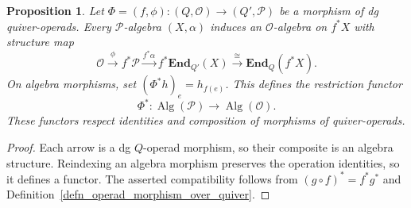 \documentclass[11pt,letterpaper]{article}
\numberwithin{equation}{section}
\theoremstyle{plain}
\newtheorem{prop}[thm]{Proposition}
\theoremstyle{definition}
\theoremstyle{remark}
\begin{document}
\begin{prop}\label{prop_change_quiver_algebras}
Let $\Phi=(f,\phi):(Q,\mathscr O)\to(Q',\mathscr P)$ be a morphism of
dg quiver-operads. Every $\mathscr P$-algebra $(X,\alpha)$ induces
an $\mathscr O$-algebra on $f^*X$ with structure map
\[
 \mathscr O\xrightarrow{\phi}f^*\mathscr P
 \xrightarrow{f^*\alpha}f^*\mathbf{End}_{Q'}(X)
 \xrightarrow{\cong}\mathbf{End}_Q(f^*X).
\]
On algebra morphisms, set $(\Phi^*h)_e=h_{f(e)}$. This defines
the \textit{restriction functor}
\[
 \Phi^*:\operatorname{Alg}(\mathscr P)
 \longrightarrow\operatorname{Alg}(\mathscr O).
\]
These functors respect identities and composition of morphisms of
quiver-operads.
\end{prop}
\begin{proof}
Each arrow is a dg $Q$-operad morphism, so their composite is an
algebra structure. Reindexing an algebra morphism preserves
the operation identities, so it defines a functor. The asserted
compatibility follows from
$(g\circ f)^*=f^*g^*$ and Definition~\ref{defn_operad_morphism_over_quiver}.
\end{proof}
\end{document}
